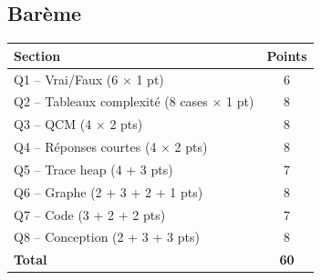 \documentclass[11pt,letterpaper]{article}
\begin{document}
\vspace{1em}

\subsection*{Barème}

\begin{center}
\begin{tabular}{|l|c|}
\hline
\textbf{Section} & \textbf{Points} \\
\hline
Q1 -- Vrai/Faux (6 $\times$ 1 pt) & 6 \\
Q2 -- Tableaux complexité (8 cases $\times$ 1 pt) & 8 \\
Q3 -- QCM (4 $\times$ 2 pts) & 8 \\
Q4 -- Réponses courtes (4 $\times$ 2 pts) & 8 \\
Q5 -- Trace heap (4 + 3 pts) & 7 \\
Q6 -- Graphe (2 + 3 + 2 + 1 pts) & 8 \\
Q7 -- Code (3 + 2 + 2 pts) & 7 \\
Q8 -- Conception (2 + 3 + 3 pts) & 8 \\
\hline
\textbf{Total} & \textbf{60} \\
\hline
\end{tabular}
\end{center}
\end{document}
